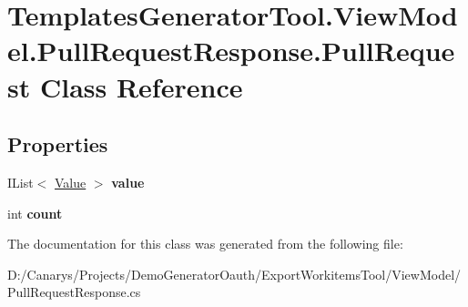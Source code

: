\hypertarget{class_templates_generator_tool_1_1_view_model_1_1_pull_request_response_1_1_pull_request}{}\section{Templates\+Generator\+Tool.\+View\+Model.\+Pull\+Request\+Response.\+Pull\+Request Class Reference}
\label{class_templates_generator_tool_1_1_view_model_1_1_pull_request_response_1_1_pull_request}
\subsection*{Properties}
\begin{DoxyCompactItemize}
\item 
\mbox{\label{class_templates_generator_tool_1_1_view_model_1_1_pull_request_response_1_1_pull_request_a161f49e8bca47c6aebca140eb435651a}} 
I\+List$<$ \mbox{\hyperlink{class_templates_generator_tool_1_1_view_model_1_1_pull_request_response_1_1_value}{Value}} $>$ {\bfseries value}
\item 
\mbox{\label{class_templates_generator_tool_1_1_view_model_1_1_pull_request_response_1_1_pull_request_aa21b7245d91a4c2ea48baf6ee9d89f57}} 
int {\bfseries count}
\end{DoxyCompactItemize}


The documentation for this class was generated from the following file\+:\begin{DoxyCompactItemize}
\item 
D\+:/\+Canarys/\+Projects/\+Demo\+Generator\+Oauth/\+Export\+Workitems\+Tool/\+View\+Model/Pull\+Request\+Response.\+cs\end{DoxyCompactItemize}

